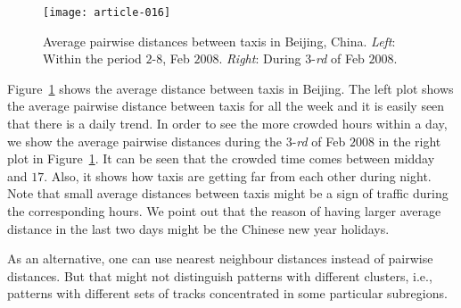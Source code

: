 \documentclass[article]{jss}
\begin{document}
\begin{figure}[!h]
\begin{center}
\texttt{[image: article-016]}
\end{center}
\caption{Average pairwise distances between taxis in Beijing, China. \emph{Left}: Within the period $2\text{-}8$, Feb $2008$. \emph{Right}: During $3$-{\it rd} of Feb $2008$.}
\label{distbijing}
\end{figure}

Figure~\ref{distbijing} shows the average distance between taxis in Beijing. The left plot shows the average pairwise distance between taxis for all the week and it is easily seen that there is a daily trend. In order to see the more crowded hours within a day, we show the average pairwise distances during the $3$-{\it rd} of Feb $2008$ in the right plot in Figure~\ref{distbijing}. It can be seen that the crowded time comes between midday and $17$. Also, it shows how taxis are getting far from each other during night. Note that small average distances between taxis might be a sign of traffic during the corresponding hours. We point out that the reason of having larger average distance in the last two days might be the Chinese new year holidays.

As an alternative, one can use nearest neighbour distances instead of pairwise distances. But that might not distinguish patterns with different clusters, i.e., patterns with different sets of tracks concentrated in some particular subregions. 
\end{document}
